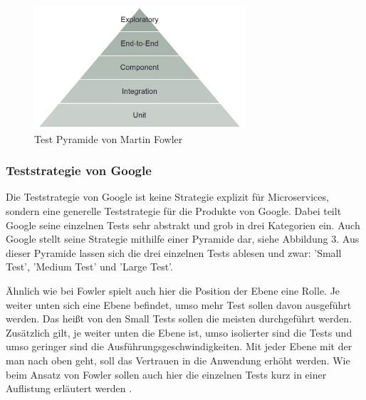 \documentclass{llncs}
\begin{document}
\begin{figure}[htbp]
  \centering
      \includegraphics[width=0.7\textwidth]{./Images/FowlerPyramide.PNG}
    \caption{Test Pyramide von Martin Fowler}
    \label{fig:PyramideFowler}
\end{figure}
\subsubsection{Teststrategie von Google}
Die Teststrategie von Google ist keine Strategie explizit für Microservices, sondern eine generelle Teststrategie für die Produkte von Google. Dabei teilt Google seine einzelnen Tests sehr abstrakt und grob in drei Kategorien ein. Auch Google stellt seine Strategie mithilfe einer Pyramide dar, siehe Abbildung 3. Aus dieser Pyramide lassen sich die drei einzelnen Tests ablesen und zwar: 'Small Test', 'Medium Test' und 'Large Test'.

Ähnlich wie bei Fowler spielt auch hier die Position der Ebene eine Rolle. Je weiter unten sich eine Ebene befindet, umso mehr Test sollen davon ausgeführt werden. Das heißt von den Small Tests sollen die meisten durchgeführt werden. Zusätzlich gilt, je weiter unten die Ebene ist, umso isolierter sind die Tests und umso geringer sind die Ausführungsgeschwindigkeiten. Mit jeder Ebene mit der man nach oben geht, soll das Vertrauen in die Anwendung erhöht werden. Wie beim Ansatz von Fowler sollen auch hier die einzelnen Tests kurz in einer Auflistung erläutert werden \cite{whittaker2012google}.
\end{document}
